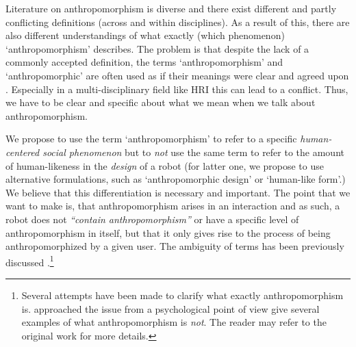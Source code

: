 \documentclass{frontiersSCNS} %
\begin{document}
Literature on anthropomorphism is diverse and there exist different and partly conflicting definitions (across and within disciplines). As a result of this, there are also different understandings of what exactly (which phenomenon) `anthropomorphism' describes.
The problem is that despite the lack of a commonly accepted definition, the terms `anthropomorphism' and `anthropomorphic' are often used as if their meanings were clear and agreed upon \citep{persson_anthropomorphism_2000}. Especially in a multi-disciplinary field like HRI this can lead to a conflict. Thus, we have to be clear and specific about what we mean when we talk about anthropomorphism.

We propose to use the term `anthropomorphism' to refer to a specific \textit{human-centered social phenomenon} but to \textit{not} use the same term to refer to the amount of human-likeness in the \textit{design} of a robot (for latter one, we propose to use alternative formulations, such as `anthropomorphic design' or `human-like form'.) We believe that this differentiation is necessary and important. The point that we want to make is, that anthropomorphism arises in an interaction and as such, a robot does not \textit{``contain anthropomorphism''} or have a specific level of anthropomorphism in itself, but that it only gives rise to the process of being anthropomorphized by a given user. The ambiguity of terms has been previously discussed \citep{persson_anthropomorphism_2000,duffy_anthropomorphism_2002}.\footnote{Several attempts have been made to clarify what exactly anthropomorphism is. \cite{epley_when_2008} approached the issue from a psychological point of view give several examples of what anthropomorphism is \textit{not}. The reader may refer to the original work for more details.}  
\end{document}
